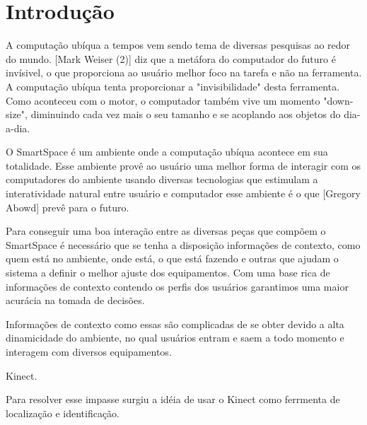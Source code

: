 \textual

\chapter{Introdução}
	
A computação ubíqua a tempos vem sendo tema de diversas pesquisas ao redor do mundo. [Mark Weiser (2)] diz que a metáfora do computador do futuro é invísivel, o que proporciona ao usuário melhor foco na tarefa e não na ferramenta. A computação ubíqua tenta proporcionar a "invisibilidade" desta ferramenta. Como aconteceu com o motor, o computador também vive um momento "down-size", diminuindo cada vez mais o seu tamanho e se acoplando aos objetos do dia-a-dia.

O SmartSpace é um ambiente onde a computação ubíqua acontece em sua totalidade. Esse ambiente provê ao usuário uma melhor forma de interagir com os computadores do ambiente usando diversas tecnologias que estimulam a interatividade natural entre usuário e computador esse ambiente é o que [Gregory Abowd] prevê para o futuro.

Para conseguir uma boa interação entre as diversas peças que compõem o SmartSpace é necessário que se tenha a disposição informações de contexto,  como quem está no ambiente, onde está, o que está fazendo e outras que ajudam o sistema a definir o melhor ajuste dos equipamentos. Com uma base rica de informações de contexto contendo os perfis dos usuários garantimos uma maior acurácia na tomada de decisões. 

Informações de contexto como essas são complicadas de se obter devido a alta dinamicidade do ambiente, no qual usuários entram e saem a todo momento e interagem com diversos equipamentos.

Kinect.

Para resolver esse impasse surgiu a idéia de usar o Kinect como ferrmenta de localização e identificação.
